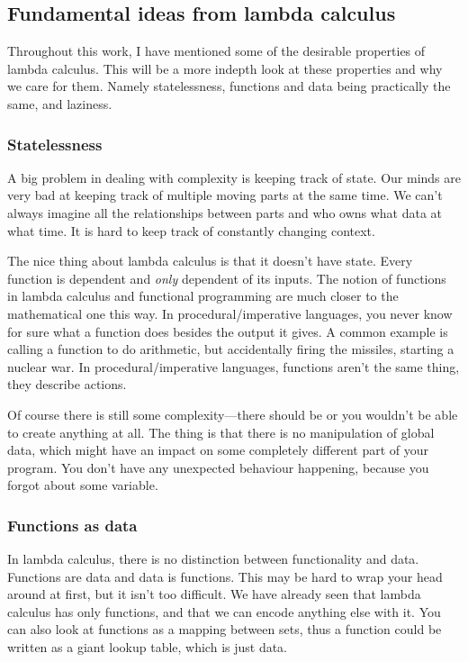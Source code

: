 \documentclass[11pt]{article}
\begin{document}
\subsection{Fundamental ideas from lambda calculus}

Throughout this work, I have mentioned some of the desirable properties of
lambda calculus. This will be a more indepth look at these properties and why
we care for them. Namely statelessness, functions and data being practically
the same, and laziness.

\subsubsection{Statelessness}\label{statelessness}

A big problem in dealing with complexity is keeping track of state. Our minds
are very bad at keeping track of multiple moving parts at the same time. We
can't always imagine all the relationships between parts and who owns what data
at what time. It is hard to keep track of constantly changing context.

The nice thing about lambda calculus is that it doesn't have state. Every
function is dependent and \emph{only} dependent of its inputs. The notion of
functions in lambda calculus and functional programming are much closer to the
mathematical one this way. In procedural/imperative languages, you never know
for sure what a function does besides the output it gives. A common example is
calling a function to do arithmetic, but accidentally firing the missiles,
starting a nuclear war. In procedural/imperative languages, functions aren't
the same thing, they describe actions.

Of course there is still some complexity---there should be or you wouldn't be
able to create anything at all. The thing is that there is no manipulation of
global data, which might have an impact on some completely different part of
your program. You don't have any unexpected behaviour happening, because you
forgot about some variable.

\subsubsection{Functions as data}

In lambda calculus, there is no distinction between functionality and data.
Functions are data and data is functions. This may be hard to wrap your head
around at first, but it isn't too difficult. We have already seen that lambda
calculus has only functions, and that we can encode anything else with it. You
can also look at functions as a mapping between sets, thus a function could be
written as a giant lookup table, which is just data.
\end{document}
